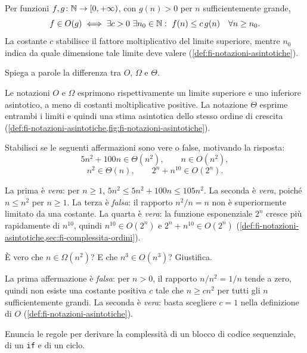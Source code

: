 Per funzioni \(f,g\colon\mathbb{N}\to[0,+\infty)\), con \(g(n)>0\)
per \(n\) sufficientemente grande,
\[
  f\in O(g)
  \iff
  \exists c>0\ \exists n_0\in\mathbb{N}:\
  f(n)\le c\,g(n)\quad\forall n\ge n_0.
\]
La costante \(c\) stabilisce il fattore moltiplicativo del
limite superiore, mentre \(n_0\) indica da quale dimensione
tale limite deve valere
(\cref{def:fi-notazioni-asintotiche}).

\begin{exercise}
\label{ex:fi-esercizi-complessita-confronto-notazioni}
Spiega a parole la differenza tra \(O\), \(\Omega\) e \(\Theta\).
\end{exercise}

Le notazioni \(O\) e \(\Omega\) esprimono rispettivamente un
limite superiore e uno inferiore asintotico, a meno di
costanti moltiplicative positive. La notazione \(\Theta\) esprime
entrambi i limiti e quindi una stima asintotica dello stesso
ordine di crescita
(\cref{def:fi-notazioni-asintotiche,fig:fi-notazioni-asintotiche}).

\begin{exercise}
\label{ex:fi-esercizi-complessita-vero-falso}
Stabilisci se le seguenti affermazioni sono vere o false,
motivando la risposta:
\[
  5n^2+100n\in\Theta(n^2),\qquad
  n\in O(n^2),
\]
\[
  n^2\in\Theta(n),\qquad
  2^n+n^{10}\in O(2^n).
\]
\end{exercise}

La prima è \emph{vera}: per \(n\ge1\),
\(5n^2\le5n^2+100n\le105n^2\).
La seconda è \emph{vera}, poiché \(n\le n^2\) per \(n\ge1\).
La terza è \emph{falsa}: il rapporto \(n^2/n=n\) non è
superiormente limitato da una costante.
La quarta è \emph{vera}: la funzione esponenziale \(2^n\)
cresce più rapidamente di \(n^{10}\), quindi
\(n^{10}\in O(2^n)\) e \(2^n+n^{10}\in O(2^n)\)
(\cref{def:fi-notazioni-asintotiche,sec:fi-complessita-ordini}).

\begin{exercise}
\label{ex:fi-esercizi-complessita-omega-cubico}
È vero che \(n\in\Omega(n^2)\)? E che \(n^3\in O(n^3)\)?
Giustifica.
\end{exercise}

La prima affermazione è \emph{falsa}: per \(n>0\), il rapporto
\(n/n^2=1/n\) tende a zero, quindi non esiste una costante
positiva \(c\) tale che \(n\ge cn^2\) per tutti gli \(n\)
sufficientemente grandi. La seconda è \emph{vera}: basta
scegliere \(c=1\) nella definizione di \(O\)
(\cref{def:fi-notazioni-asintotiche}).

\begin{exercise}
\label{ex:fi-esercizi-complessita-regole-costo}
Enuncia le regole per derivare la complessità di un blocco
di codice sequenziale, di un \lstinline|if| e di un ciclo.
\end{exercise}

